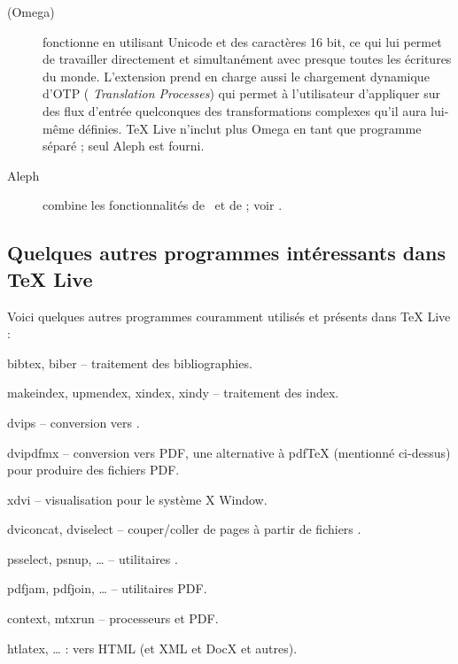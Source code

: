\documentclass[german, english, french]{article}
\renewcommand{\TL}{\TeX{} Live\xspace}%
\begin{document}
\begin{description}
\item[\OMEGA{} (Omega)] fonctionne en utilisant Unicode et des caractères 16
  bit, ce qui lui permet de travailler directement et simultanément avec
  presque toutes les écritures du monde.  L'extension prend en charge aussi le
  chargement dynamique d'OTP (\OMEGA{} \emph{Translation Processes}) qui permet
  à l'utilisateur d'appliquer sur des flux d'entrée quelconques des
  transformations complexes qu'il aura lui-même définies. \TL n'inclut plus
  Omega en tant que programme séparé ; seul Aleph est fourni.

\item[Aleph] combine les fonctionnalités de \OMEGA\ et de \eTeX ; voir
  .

\end{description}

\subsection{Quelques autres programmes intéressants dans \protect\TL}

Voici quelques autres programmes couramment utilisés et présents dans \TL{} :

\begin{cmddescription}

\item[bibtex, biber] -- traitement des bibliographies.

\item[makeindex, upmendex, xindex, xindy] -- traitement des index.

\item[dvips] -- conversion \dvi{} vers \PS{}.

\item[dvipdfmx] -- conversion \dvi{} vers PDF, une alternative à pdf\TeX{}
  (mentionné ci-dessus) pour produire des fichiers PDF.

\item[xdvi] -- visualisation \dvi{} pour le système X Window.

\item[dviconcat, dviselect] -- couper/coller de pages à partir de fichiers
  \dvi{}.

\item[psselect, psnup, \ldots] -- utilitaires \PS{}.

\item[pdfjam, pdfjoin, \ldots] -- utilitaires PDF.

\item[context, mtxrun] -- processeurs \ConTeXt{} et PDF.

\item [htlatex, \ldots]  : \AllTeX{} vers HTML (et XML et DocX
  et autres).

\end{cmddescription}
\end{document}
